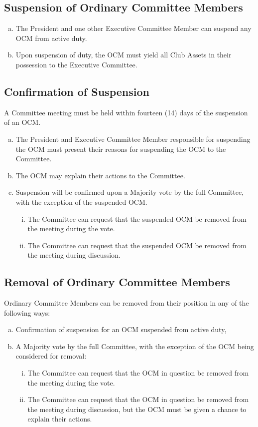 \documentclass[a4paper,12pt]{article}
\begin{document}
\subsection{Suspension of Ordinary Committee Members}

\begin{enumerate}[a)]
	\item The President and one other Executive Committee Member can suspend any OCM from active duty.
	\item Upon suspension of duty, the OCM must yield all Club Assets in their possession to the Executive Committee.
\end{enumerate}

\subsection{Confirmation of Suspension}

A Committee meeting must be held within fourteen (14) days of the suspension of an OCM.

\begin{enumerate}[a)]
	\item The President and Executive Committee Member responsible for suspending the OCM must present their reasons for suspending the OCM to the Committee.
	\item The OCM may explain their actions to the Committee.
	\item Suspension will be confirmed upon a Majority vote by the full Committee, with the exception of the suspended OCM.
	\begin{enumerate}[i)]
		\item The Committee can request that the suspended OCM be removed from the meeting during the vote.
		\item The Committee can request that the suspended OCM be removed from the meeting during discussion.
	\end{enumerate}
\end{enumerate}

\subsection{Removal of Ordinary Committee Members}

Ordinary Committee Members can be removed from their position in any of the following ways:

\begin{enumerate}[a)]
	\item Confirmation of suspension for an OCM suspended from active duty,
	\item A Majority vote by the full Committee, with the exception of the OCM being considered for removal:
	\begin{enumerate}[i)]
		\item The Committee can request that the OCM in question be removed from the meeting during the vote.
		\item The Committee can request that the OCM in question be removed from the meeting during discussion, but the OCM must be given a chance to explain their actions.
	\end{enumerate}
\end{enumerate}
\end{document}
